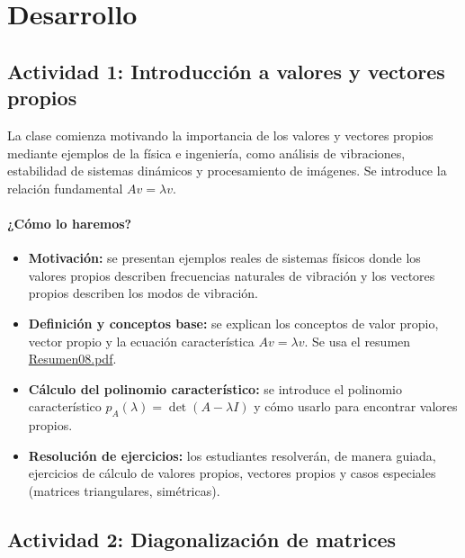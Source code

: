 \documentclass[a4,11pt]{aleph-notas}
\begin{document}
\section*{Desarrollo}  

\subsection*{Actividad 1: Introducción a valores y vectores propios}

La clase comienza motivando la importancia de los valores y vectores propios mediante ejemplos de la física e ingeniería, como análisis de vibraciones, estabilidad de sistemas dinámicos y procesamiento de imágenes. Se introduce la relación fundamental $Av = \lambda v$.

\paragraph{¿Cómo lo haremos?}  
\begin{itemize}[leftmargin=*]  
    \item \textbf{Motivación:} se presentan ejemplos reales de sistemas físicos donde los valores propios describen frecuencias naturales de vibración y los vectores propios describen los modos de vibración.
    \item \textbf{Definición y conceptos base:} se explican los conceptos de valor propio, vector propio y la ecuación característica $Av = \lambda v$. Se usa el resumen \href{https://fcena-puce.github.io/AlgLinealyGeomAnalitica-05-N0068/2-Resumenes/Resumen08.pdf}{Resumen08.pdf}.  
    \item \textbf{Cálculo del polinomio característico:} se introduce el polinomio característico $p_A(\lambda) = \det(A - \lambda I)$ y cómo usarlo para encontrar valores propios.
    \item \textbf{Resolución de ejercicios:} los estudiantes resolverán, de manera guiada, ejercicios de cálculo de valores propios, vectores propios y casos especiales (matrices triangulares, simétricas).
\end{itemize}  

\subsection*{Actividad 2: Diagonalización de matrices}
\end{document}
